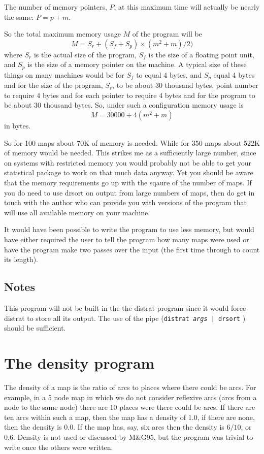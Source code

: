 \documentclass[%
	11pt,
        a4paper,
        twoside]{workrep}
\newcommand*{\prg}[1]{\textsf{#1}}		%
\newcommand*{\cmd}[1]{\texttt{#1}}		%
\newcommand{\MG}{M\&G95\xspace}			%
\begin{document}
The number of memory pointers, $P$, at this maximum time will
actually be nearly the same: $P = p + m$.

So the total maximum memory usage $M$ of the program will be
\[
M = S_r + (S_f + S_p)\times(m^2+m)/2)
\]
where $S_r$ is the actual size of the program, $S_f$ is the size
of a floating point unit, and $S_p$ is the size of a memory pointer
on the machine.
A typical size of these things on many machines would be for 
$S_f$ to equal 4 bytes, and $S_p$ equal 4 bytes and for the size
of the program, $S_r$, to be about 30 thousand bytes.
point number to require 4 bytes and for each pointer to require 4
bytes and for the program to be about 30 thousand bytes.  So, under
such a configuration memory usage is
\[
M = 30000 + 4(m^2+m)
\]
in bytes.

So for 100 maps about 70K of memory is needed.  While for 350 maps
about 522K of memory would be needed.  This strikes me as a
sufficiently large number, since on systems with restricted memory
you would probably not be able to get your statistical package to
work on that much data anyway.  Yet you should be aware that the memory
requirements go up with the sqaure of the number of maps.
If you do need to use \prg{drsort} on output from large numbers
of maps, then do get in touch with the author who can provide
you with versions of the program that will use all available memory
on your machine.

It would have been possible to write the program to use less memory,
but would have either required the user to tell the program
how many maps were used or have the program make two passes
over the input (the first time through to count its length).

\section{Notes}

This program will not be built in the the \prg{distrat} program
since it would force \prg{distrat} to store all its
output.  The use of the pipe (\cmd{distrat \textit{args} | drsort} ) should
be sufficient.

\chapter{The \prg{density} program}\label{ch:density}

The density of a map is the ratio of arcs to places where there could
be arcs.  For example, in a 5 node map in which we do not consider
reflexive arcs (arcs from a node to the same node) there are 10
places were there could be arcs.  If there are ten arcs within such a
map, then the map has a density of 1.0, if there are none, then the
density is 0.0.  If the map has, say, six arcs then the density is
$6/10$, or 0.6.  Density is not used or discussed by \MG, but the program
was trivial to write once the others were written.
\end{document}
